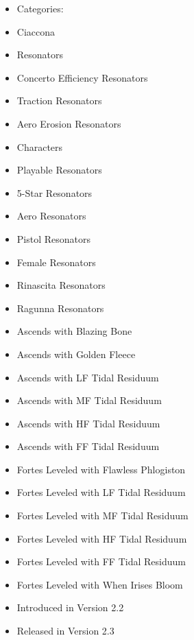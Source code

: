 \documentclass[a4paper,12pt]{article}
\begin{document}
\begin{itemize}
\item Categories:
\item Ciaccona
\item Resonators
\item Concerto Efficiency Resonators
\item Traction Resonators
\item Aero Erosion Resonators
\item Characters
\item Playable Resonators
\item 5-Star Resonators
\item Aero Resonators
\item Pistol Resonators
\item Female Resonators
\item Rinascita Resonators
\item Ragunna Resonators
\item Ascends with Blazing Bone
\item Ascends with Golden Fleece
\item Ascends with LF Tidal Residuum
\item Ascends with MF Tidal Residuum
\item Ascends with HF Tidal Residuum
\item Ascends with FF Tidal Residuum
\item Fortes Leveled with Flawless Phlogiston
\item Fortes Leveled with LF Tidal Residuum
\item Fortes Leveled with MF Tidal Residuum
\item Fortes Leveled with HF Tidal Residuum
\item Fortes Leveled with FF Tidal Residuum
\item Fortes Leveled with When Irises Bloom
\item Introduced in Version 2.2
\item Released in Version 2.3
\end{itemize}\\ \par \vspace{0.5cm}
\end{document}
